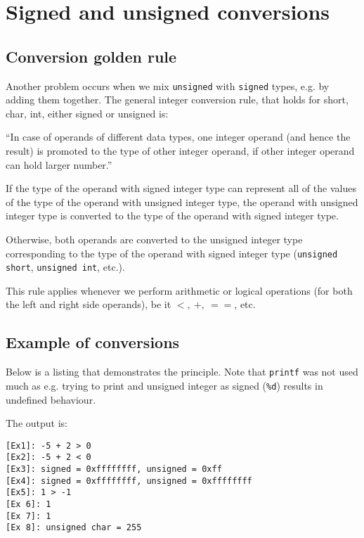 \documentclass[a4paper]{article}
\begin{document}
\section{Signed and unsigned conversions}


\subsection{Conversion golden rule}

Another problem occurs when we mix \texttt{unsigned} with \texttt{signed} types, e.g. by adding them together. The general integer conversion rule, that holds for short, char, int, either signed or unsigned is:

\begin{adjustwidth}{1cm}{1cm}
``In case of operands of different data types, one integer operand (and hence the result) is promoted to the type of other integer operand, if other integer operand can hold larger number.''
\end{adjustwidth}

If the type of the operand with signed integer type can represent all of the values of the type of the operand with unsigned integer type, the operand with unsigned integer type is converted to the type of the operand with signed integer type.

Otherwise, both operands are converted to the unsigned integer type corresponding to the type of the operand with signed integer type (\texttt{unsigned short}, \texttt{unsigned int}, etc.).

This rule applies whenever we perform arithmetic or logical operations (for both the left and right side operands), be it $<, \: +, \: ==$, etc.



\subsection{Example of conversions}

Below is a listing that demonstrates the principle. Note that \texttt{printf} was not used much as e.g. trying to print and unsigned integer as signed (\texttt{\%d}) results in undefined behaviour.



The output is:
\begin{verbatim}
[Ex1]: -5 + 2 > 0
[Ex2]: -5 + 2 < 0
[Ex3]: signed = 0xffffffff, unsigned = 0xff
[Ex4]: signed = 0xffffffff, unsigned = 0xffffffff
[Ex5]: 1 > -1
[Ex 6]: 1
[Ex 7]: 1
[Ex 8]: unsigned char = 255
\end{verbatim}
\end{document}
